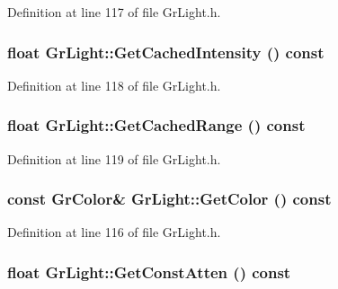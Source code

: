 Definition at line 117 of file GrLight.h.\hypertarget{class_gr_light_66a3c55f050abc2ef369eb202ce8f52b}{
\subsubsection[{GetCachedIntensity}]{\setlength{\rightskip}{0pt plus 5cm}float GrLight::GetCachedIntensity () const}}
\label{class_gr_light_66a3c55f050abc2ef369eb202ce8f52b}




Definition at line 118 of file GrLight.h.\hypertarget{class_gr_light_32c3d7ec239d9b3a08869ecff626cc29}{
\subsubsection[{GetCachedRange}]{\setlength{\rightskip}{0pt plus 5cm}float GrLight::GetCachedRange () const}}
\label{class_gr_light_32c3d7ec239d9b3a08869ecff626cc29}




Definition at line 119 of file GrLight.h.\hypertarget{class_gr_light_d7333ae546a74b630df61693d0b47133}{
\subsubsection[{GetColor}]{\setlength{\rightskip}{0pt plus 5cm}const {\bf GrColor}\& GrLight::GetColor () const}}
\label{class_gr_light_d7333ae546a74b630df61693d0b47133}




Definition at line 116 of file GrLight.h.\hypertarget{class_gr_light_928a8bb4de60ade8850be9e349d82c90}{
\subsubsection[{GetConstAtten}]{\setlength{\rightskip}{0pt plus 5cm}float GrLight::GetConstAtten () const}}
\label{class_gr_light_928a8bb4de60ade8850be9e349d82c90}





